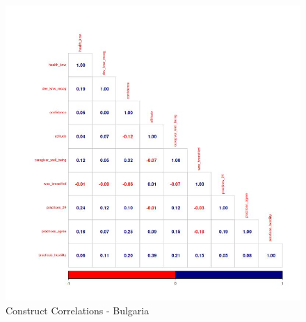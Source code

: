 \documentclass{article}
\begin{document}
\begin{figure}
    \includegraphics[scale=0.42]{descriptives/plots/correlations_constructs_bulgaria__baseline.jpg}
    \caption{Construct Correlations - Bulgaria}
    \label{fig:enter-label}
\end{figure}
\end{document}

